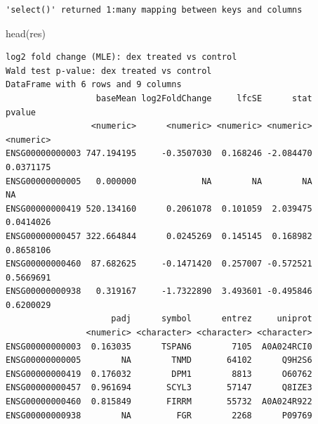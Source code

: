 \documentclass[
  letterpaper,
  DIV=11,
  numbers=noendperiod]{scrartcl}
\newenvironment{Shaded}{\begin{snugshade}}{\end{snugshade}}
\newcommand{\AttributeTok}[1]{\textcolor[rgb]{0.40,0.45,0.13}{#1}}
\newcommand{\CommentTok}[1]{\textcolor[rgb]{0.37,0.37,0.37}{#1}}
\newcommand{\FunctionTok}[1]{\textcolor[rgb]{0.28,0.35,0.67}{#1}}
\newcommand{\NormalTok}[1]{\textcolor[rgb]{0.00,0.23,0.31}{#1}}
\newcommand{\OtherTok}[1]{\textcolor[rgb]{0.00,0.23,0.31}{#1}}
\newcommand{\SpecialCharTok}[1]{\textcolor[rgb]{0.37,0.37,0.37}{#1}}
\newcommand{\StringTok}[1]{\textcolor[rgb]{0.13,0.47,0.30}{#1}}
\begin{document}
\begin{verbatim}
'select()' returned 1:many mapping between keys and columns
\end{verbatim}

\begin{Shaded}
\begin{Highlighting}[]
\FunctionTok{head}\NormalTok{(res)}
\end{Highlighting}
\end{Shaded}

\begin{verbatim}
log2 fold change (MLE): dex treated vs control 
Wald test p-value: dex treated vs control 
DataFrame with 6 rows and 9 columns
                  baseMean log2FoldChange     lfcSE      stat    pvalue
                 <numeric>      <numeric> <numeric> <numeric> <numeric>
ENSG00000000003 747.194195     -0.3507030  0.168246 -2.084470 0.0371175
ENSG00000000005   0.000000             NA        NA        NA        NA
ENSG00000000419 520.134160      0.2061078  0.101059  2.039475 0.0414026
ENSG00000000457 322.664844      0.0245269  0.145145  0.168982 0.8658106
ENSG00000000460  87.682625     -0.1471420  0.257007 -0.572521 0.5669691
ENSG00000000938   0.319167     -1.7322890  3.493601 -0.495846 0.6200029
                     padj      symbol      entrez     uniprot
                <numeric> <character> <character> <character>
ENSG00000000003  0.163035      TSPAN6        7105  A0A024RCI0
ENSG00000000005        NA        TNMD       64102      Q9H2S6
ENSG00000000419  0.176032        DPM1        8813      O60762
ENSG00000000457  0.961694       SCYL3       57147      Q8IZE3
ENSG00000000460  0.815849       FIRRM       55732  A0A024R922
ENSG00000000938        NA         FGR        2268      P09769
\end{verbatim}

\begin{Shaded}
\end{Shaded}
\end{document}
